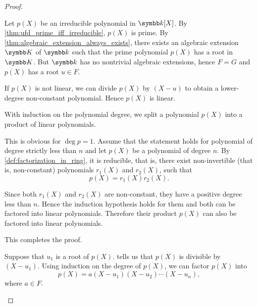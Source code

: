\begin{proof}
  \begin{description}
     Let \( p(X) \) be an irreducible polynomial in \( \Bk[X] \). By \cref{thm:ufd_prime_iff_irreducible}, \( p(X) \) is prime. By \cref{thm:algebraic_extension_always_exists}, there exists an algebraic extension \( \BK \) of \( \Bk \) such that the prime polynomial \( p(X) \) has a root in \( \BK \). But \( \Bk \) has no nontrivial algebraic extensions, hence \( F = G \) and \( p(X) \) has a root \( u \in F \).

    If \( p(X) \) is not linear\LEM, we can divide \( p(X) \) by \( (X - u) \) to obtain a lower-degree non-constant polynomial. Hence \( p(X) \) is linear.

     With induction on the polynomial degree, we split a polynomial \( p(X) \) into a product of linear polynomials.

    This is obvious for \( \deg p = 1 \). Assume that the statement holds for polynomial of degree strictly less than \( n \) and let \( p(X) \) be a polynomial of degree \( n \). By \cref{def:factorization_in_ring}, it is reducible, that is, there exist non-invertible (that is, non-constant) polynomials \( r_1(X) \) and \( r_2(X) \), such that
    \begin{equation*}
      p(X) = r_1(X) r_2(X).
    \end{equation*}

    Since both \( r_1(X) \) and \( r_2(X) \) are non-constant, they have a positive degree less than \( n \). Hence the induction hypothesis holds for them and both can be factored into linear polynomials. Therefore their product \( p(X) \) can also be factored into linear polynomials.

    This completes the proof.

     Suppose that \( u_1 \) is a root of \( p(X) \).  tells us that \( p(X) \) is divisible by \( (X - u_1) \). Using induction on the degree of \( p(X) \), we can factor \( p(X) \) into
    \begin{equation*}
      p(X) = a (X - u_1) (X - u_2) \cdots (X - u_n),
    \end{equation*}
    where \( a \in F \).


\end{description}
\end{proof}
